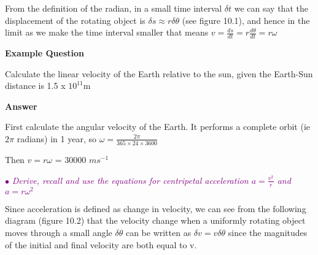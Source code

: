 \documentclass[a4paper,11pt,twoside]{memoir}
\newcounter{spec}[chapter]
\newcommand{\spec}[1]{\Needspace{5\baselineskip}\textcolor{purple}{$\bullet$\hspace{0.5cm}\textit{#1}}}
\newcommand{\answer}{\par \textbf{Answer} \par}
\newenvironment{example}
{\begin{lrbox}{\examplebox}\begin{minipage}{0.9\textwidth}\textbf{Example Question}\par}
{\end{minipage}\end{lrbox}\fbox{\usebox{\examplebox}}}
\begin{document}
From the definition of the radian, in a small time interval $\delta t$ we can say that the displacement of the rotating object is $\delta s \approx r\delta\theta$ (see figure 10.1), and hence in the limit as we make the time interval smaller that means $v=\frac{ds}{dt} = r\frac{d\theta}{dt}=r\omega$

\begin{example}
	Calculate the linear velocity of the Earth relative to the sun, given the Earth-Sun distance is 1.5 x $10^{11} $m

\answer First calculate the angular velocity of the Earth. It performs a complete orbit (ie $2\pi$ radians) in 1 year, so $\omega= \frac{2\pi}{365\times24\times3600}$

Then $v=r\omega$ = 30000 $ms^{-1}$
\end{example}
\spec{
	Derive, recall and use the equations for centripetal acceleration $a = \frac{v ^{2}}{r}$ and $a = r\omega ^{2}$
}

Since acceleration is defined as change in velocity, we can see from the following diagram (figure 10.2) that the velocity change when a uniformly rotating object moves through a small angle $\delta\theta$ can be written as $\delta v = v\delta\theta$ since the magnitudes of the initial and final velocity are both equal to v.
\\
\\

\begin{figure}[h]
	\begin{center}
	\end{center}
	\caption{}
\end{figure}
\end{document}

